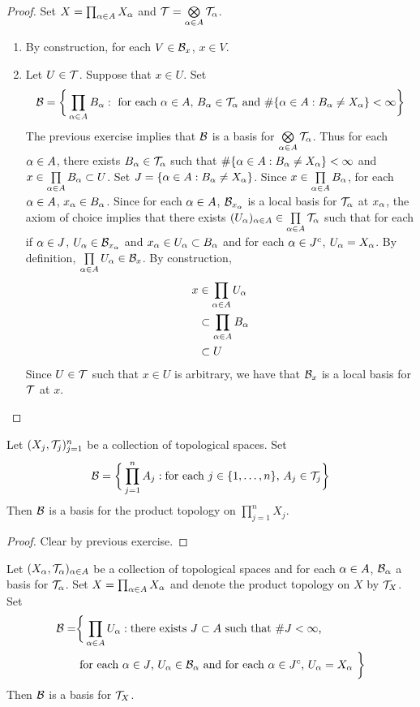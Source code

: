 \documentclass{book}
\begin{document}
	\begin{proof}Set $X = \prod_{\alpha \in A}X_{\alpha}$ and $\mathcal{T} = \bigotimes\limits_{\alpha \in A} \mathcal{T}_{\alpha}$.
		\begin{enumerate}
			\item By construction, for each $V \in \mathcal{B}_x$, $x \in V$. 
			\item Let $U \in \mathcal{T}$. Suppose that $x \in U$. Set 
			$$\mathcal{B} = \bigg \{\prod_{\alpha \in A}B_{\alpha}: \text{ for each $\alpha \in A$,  $B_{\alpha} \in \mathcal{T}_{\alpha}$ and $\# \{\alpha \in A: B_{\alpha} \neq X_{\alpha}\} < \infty$} \bigg\}$$
			The previous exercise implies that $\mathcal{B}$ is a basis for $\bigotimes\limits_{\alpha \in A} \mathcal{T}_{\alpha}$. Thus for each $\alpha \in A$, there exists $B_{\alpha} \in \mathcal{T}_{\alpha}$ such that $\# \{\alpha \in A: B_{\alpha} \neq X_{\alpha}\} < \infty$ and $x \in \prod\limits_{\alpha \in A} B_{\alpha} \subset U$. Set $J = \{\alpha \in A: B_{\alpha} \neq X_{\alpha}\}$. Since $x \in \prod\limits_{\alpha \in A} B_{\alpha}$, for each $\alpha \in A$, $x_{\alpha} \in B_{\alpha}$. Since for each $\alpha \in A$, $\mathcal{B}_{x_{\alpha}}$ is a local basis for $\mathcal{T}_{\alpha}$ at $x_{\alpha}$, the axiom of choice implies that there exists $(U_{\alpha})_{\alpha \in A} \in \prod\limits_{\alpha \in A} \mathcal{T}_{\alpha}$ such that for each if $\alpha \in J$, $U_{\alpha} \in \mathcal{B}_{x_{\alpha}}$ and $x_{\alpha} \in U_{\alpha} \subset B_{\alpha}$ and  for each $\alpha \in J^c$, $U_{\alpha} = X_{\alpha}$. By definition, $\prod\limits_{\alpha \in A} U_{\alpha} \in \mathcal{B}_x$. By construction, 
			\begin{align*}
				x 
				& \in \prod_{\alpha \in A} U_{\alpha} \\
				& \subset \prod_{\alpha \in A} B_{\alpha} \\
				& \subset U
			\end{align*}
			Since $U \in \mathcal{T}$ such that $x \in U$ is arbitrary, we have that $\mathcal{B}_x$ is a local basis for $\mathcal{T}$ at $x$. 
		\end{enumerate}
	\end{proof}

	\begin{ex}
		Let $(X_j, \mathcal{T}_j)_{j =1}^n$ be a collection of topological spaces. Set 
		$$\mathcal{B} = \bigg \{\prod\limits_{j=1}^n A_j: \text{for each $j \in \{1, \ldots, n\}$, } A_j \in \mathcal{T}_{j} \bigg \}$$ 
		Then $\mathcal{B}$ is a basis for the product topology on $\prod_{j=1}^n X_j$.
	\end{ex}

	\begin{proof}
		Clear by previous exercise.
	\end{proof}

	\begin{ex}
		Let $(X_{\alpha}, \mathcal{T}_{\alpha})_{\alpha \in A}$ be a collection of topological spaces and for each $\alpha \in A$, $\mathcal{B}_{\alpha}$ a basis for $\mathcal{T}_{\alpha}$. Set $X = \prod_{\alpha \in A} X_{\alpha}$ and denote the product topology on $X$ by $\mathcal{T}_X$. Set 
		\begin{align*}
			\mathcal{B} = 
			& \bigg \{\prod_{\alpha \in A} U_{\alpha}: \text{there exists $J \subset A$ such that $ \# J < \infty$, } \\
			& \text{ for each $\alpha \in J$, $U_{\alpha} \in \mathcal{B}_{\alpha}$ and for each $\alpha \in J^c$, $U_{\alpha} = X_{\alpha}$ } \bigg \}
		\end{align*} 
		Then $\mathcal{B}$ is a basis for $\mathcal{T}_X$.
	\end{ex}
\end{document}
